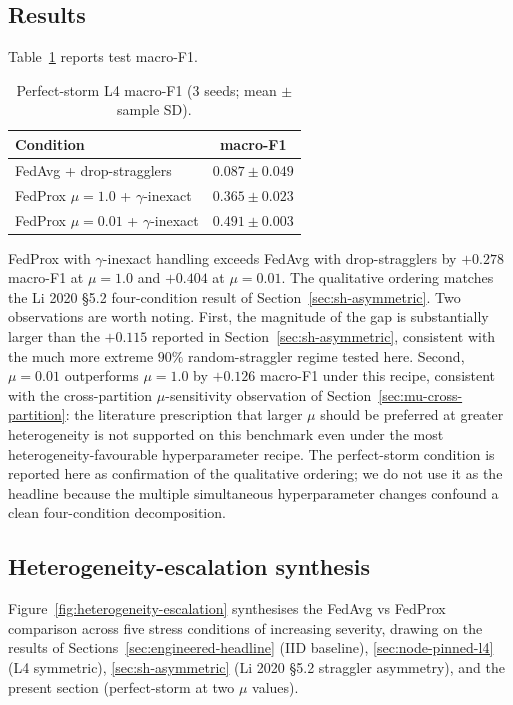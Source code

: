 \documentclass[11pt,a4paper]{report}
\begin{document}
\subsection{Results}
Table~\ref{tab:perfect-storm} reports test macro-F1.

\begin{table}[!htbp]
\centering
\caption{Perfect-storm L4 macro-F1 (3 seeds; mean $\pm$ sample SD).}
\label{tab:perfect-storm}
\small
\begin{tabular}{lc}
\toprule
Condition & macro-F1 \\
\midrule
FedAvg + drop-stragglers                  & $0.087 \pm 0.049$ \\
FedProx $\mu{=}1.0$ + $\gamma$-inexact    & $0.365 \pm 0.023$ \\
FedProx $\mu{=}0.01$ + $\gamma$-inexact   & $\mathbf{0.491 \pm 0.003}$ \\
\bottomrule
\end{tabular}
\end{table}

FedProx with $\gamma$-inexact handling exceeds FedAvg with
drop-stragglers by $+0.278$ macro-F1 at $\mu = 1.0$ and $+0.404$ at
$\mu = 0.01$. The qualitative ordering matches the Li 2020 §5.2
four-condition result of Section~\ref{sec:sh-asymmetric}. Two
observations are worth noting. First, the magnitude of the gap is
substantially larger than the $+0.115$ reported in
Section~\ref{sec:sh-asymmetric}, consistent with the much more
extreme $90\%$ random-straggler regime tested here. Second,
$\mu = 0.01$ outperforms $\mu = 1.0$ by $+0.126$ macro-F1 under this
recipe, consistent with the cross-partition $\mu$-sensitivity
observation of Section~\ref{sec:mu-cross-partition}: the literature
prescription that larger $\mu$ should be preferred at greater
heterogeneity is not supported on this benchmark even under the most
heterogeneity-favourable hyperparameter recipe. The perfect-storm
condition is reported here as confirmation of the qualitative
ordering; we do not use it as the headline because the multiple
simultaneous hyperparameter changes confound a clean four-condition
decomposition.

\subsection{Heterogeneity-escalation synthesis}
\label{sec:perfect-storm-synthesis}

Figure~\ref{fig:heterogeneity-escalation} synthesises the FedAvg vs
FedProx comparison across five stress conditions of increasing
severity, drawing on the results of
Sections~\ref{sec:engineered-headline} (IID baseline),
\ref{sec:node-pinned-l4} (L4 symmetric),
\ref{sec:sh-asymmetric} (Li 2020 §5.2 straggler asymmetry), and the
present section (perfect-storm at two $\mu$ values).
\end{document}
